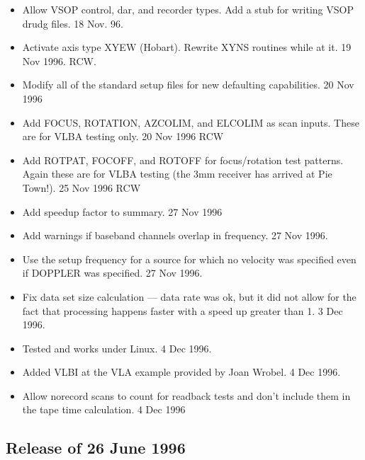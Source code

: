 \documentclass{report}
\begin{document}
\begin{itemize}
\item Allow VSOP control, dar, and recorder types.  Add a stub for
      writing VSOP drudg files.  18 Nov. 96.

\item Activate axis type XYEW (Hobart).  Rewrite XYNS routines while
      at it. 19 Nov 1996.  RCW.

\item Modify all of the standard setup files for new defaulting
      capabilities.  20 Nov 1996

\item Add FOCUS, ROTATION, AZCOLIM, and ELCOLIM as scan inputs.
      These are for VLBA testing only.  20 Nov 1996  RCW

\item Add ROTPAT, FOCOFF, and ROTOFF for focus/rotation test patterns.
      Again these are for VLBA testing (the 3mm receiver has arrived
      at Pie Town!).   25 Nov 1996  RCW

\item Add speedup factor to summary.  27 Nov 1996

\item Add warnings if baseband channels overlap in frequency. 27 Nov 1996.

\item Use the setup frequency for a source for which no velocity was
      specified even if DOPPLER was specified.  27 Nov 1996.

\item Fix data set size calculation --- data rate was ok, but it did not
      allow for the fact that processing happens faster with a
      speed up greater than 1. 3 Dec 1996.

\item Tested and works under Linux.  4 Dec 1996.

\item Added VLBI at the VLA example provided by Joan Wrobel.  4 Dec 1996.

\item Allow norecord scans to count for readback tests and don't
      include them in the tape time calculation.  4 Dec 1996

\end{itemize}

\subsection{\label{SSSEC:JUN96}Release of 26 June 1996}
\end{document}
